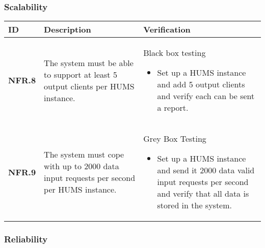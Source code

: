 \subsubsection{Scalability}

\begin{table}[h!]
    \begin{tabular}{|p{1.5cm}|p{6.0cm}|p{9.0cm}|}
    \hline
    \textbf{ID} & \textbf{Description} & \textbf{Verification} \\ \hline
    \textbf{NFR.8} & The system must be able to support at least 5 output clients per HUMS instance. & Black box testing\begin{itemize}\item Set up a HUMS instance and add 5 output clients and verify each can be sent a report.\end{itemize} \\ \hline
    \textbf{NFR.9} & The system must cope with up to 2000 data input requests per second per HUMS instance. & Grey Box Testing\begin{itemize}\item Set up a HUMS instance and send it 2000 data valid input requests per second and verify that all data is stored in the system.\end{itemize} \\ \hline
    \end{tabular}
\end{table}

\subsubsection{Reliability}

